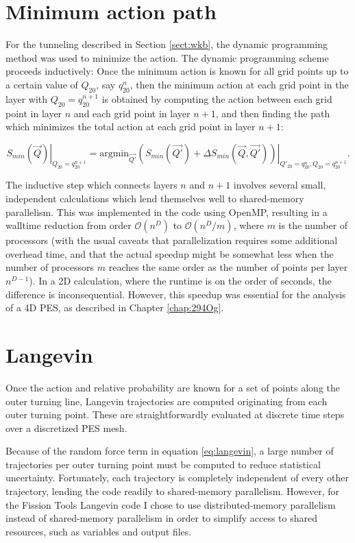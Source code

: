 \section{Minimum action path}
For the tunneling described in Section \ref{sect:wkb}, the dynamic programming method \cite{Baran1981} was used to minimize the action. The dynamic programming scheme proceeds inductively: Once the minimum action is known for all grid points up to a certain value of $Q_{20}$, say $q_{20}^n$, then the minimum action at each grid point in the layer with $Q_{20}=q_{20}^{n+1}$ is obtained by computing the action between each grid point in layer $n$ and each grid point in layer $n+1$, and then finding the path which minimizes the total action at each grid point in layer $n+1$:

\begin{equation}
\left.S_{min}(\vec{Q})\right|_{Q_{20}=q_{20}^{n+1}} = \mathrm{argmin}_{\vec{Q'}}\left.\left(S_{min}(\vec{Q'}) + \Delta S_{min}(\vec{Q},\vec{Q'})\right)\right|_{Q'_{20}=q_{20}^{n}, Q_{20}=q_{20}^{n+1}}.
\end{equation}

The inductive step which connects layers $n$ and $n+1$ involves several small, independent calculations which lend themselves well to shared-memory parallelism. This was implemented in the code using OpenMP, resulting in a walltime reduction from order $\mathcal{O}(n^D)$ to $\mathcal{O}(n^D/m)$, where $m$ is the number of processors (with the usual caveats that parallelization requires some additional overhead time, and that the actual speedup might be somewhat less when the number of processors $m$ reaches the same order as the number of points per layer $n^{D-1}$). In a 2D calculation, where the runtime is on the order of seconds, the difference is inconsequential. However, this speedup was essential for the analysis of a 4D PES, as described in Chapter \ref{chap:294Og}.


\section{Langevin}
Once the action and relative probability are known for a set of points along the outer turning line, Langevin trajectories are computed originating from each outer turning point. These are straightforwardly evaluated at discrete time steps over a discretized PES mesh.

Because of the random force term in equation \ref{eq:langevin}, a large number of trajectories per outer turning point must be computed to reduce statistical uncertainty. Fortunately, each trajectory is completely independent of every other trajectory, lending the code readily to shared-memory parallelism. However, for the Fission Tools Langevin code I chose to use distributed-memory parallelism instead of shared-memory parallelism in order to simplify access to shared resources, such as variables and output files.